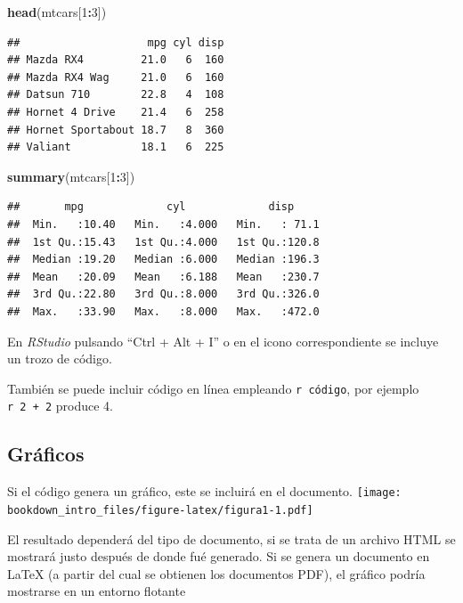 \documentclass[]{book}
\newenvironment{Shaded}{\begin{snugshade}}{\end{snugshade}}
\newcommand{\KeywordTok}[1]{\textcolor[rgb]{0.13,0.29,0.53}{\textbf{#1}}}
\newcommand{\DecValTok}[1]{\textcolor[rgb]{0.00,0.00,0.81}{#1}}
\newcommand{\OperatorTok}[1]{\textcolor[rgb]{0.81,0.36,0.00}{\textbf{#1}}}
\newcommand{\NormalTok}[1]{#1}
\theoremstyle{definition}
\theoremstyle{definition}
\theoremstyle{definition}
\theoremstyle{remark}
\begin{document}
\begin{Shaded}
\begin{Highlighting}[]
\KeywordTok{head}\NormalTok{(mtcars[}\DecValTok{1}\OperatorTok{:}\DecValTok{3}\NormalTok{])}
\end{Highlighting}
\end{Shaded}

\begin{verbatim}
##                    mpg cyl disp
## Mazda RX4         21.0   6  160
## Mazda RX4 Wag     21.0   6  160
## Datsun 710        22.8   4  108
## Hornet 4 Drive    21.4   6  258
## Hornet Sportabout 18.7   8  360
## Valiant           18.1   6  225
\end{verbatim}

\begin{Shaded}
\begin{Highlighting}[]
\KeywordTok{summary}\NormalTok{(mtcars[}\DecValTok{1}\OperatorTok{:}\DecValTok{3}\NormalTok{])}
\end{Highlighting}
\end{Shaded}

\begin{verbatim}
##       mpg             cyl             disp      
##  Min.   :10.40   Min.   :4.000   Min.   : 71.1  
##  1st Qu.:15.43   1st Qu.:4.000   1st Qu.:120.8  
##  Median :19.20   Median :6.000   Median :196.3  
##  Mean   :20.09   Mean   :6.188   Mean   :230.7  
##  3rd Qu.:22.80   3rd Qu.:8.000   3rd Qu.:326.0  
##  Max.   :33.90   Max.   :8.000   Max.   :472.0
\end{verbatim}

En \emph{RStudio} pulsando ``Ctrl + Alt + I'' o en el icono
correspondiente se incluye un trozo de código.

También se puede incluir código en línea empleando
\texttt{\textasciigrave{}r\ código\textasciigrave{}}, por ejemplo
\texttt{\textasciigrave{}r\ 2\ +\ 2\textasciigrave{}} produce 4.

\subsection{Gráficos}\label{graficos}

Si el código genera un gráfico, este se incluirá en el documento.
\texttt{[image: bookdown\_intro\_files/figure-latex/figura1-1.pdf]}

El resultado dependerá del tipo de documento, si se trata de un archivo
HTML se mostrará justo después de donde fué generado. Si se genera un
documento en LaTeX (a partir del cual se obtienen los documentos PDF),
el gráfico podría mostrarse en un entorno flotante
\end{document}

